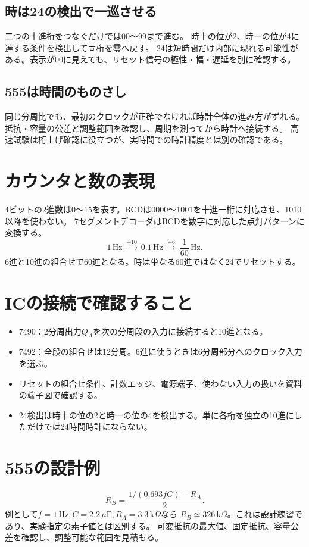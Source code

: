 \documentclass[lualatex,a4paper,10pt]{jlreq}
\begin{document}
\subsection{時は24の検出で一巡させる}
二つの十進桁をつなぐだけでは00〜99まで進む。
時十の位が2、時一の位が4に達する条件を検出して両桁を零へ戻す。
24は短時間だけ内部に現れる可能性がある。表示が00に見えても、リセット信号の極性・幅・遅延を別に確認する。
\subsection{555は時間のものさし}
同じ分周比でも、最初のクロックが正確でなければ時計全体の進み方がずれる。
抵抗・容量の公差と調整範囲を確認し、周期を測ってから時計へ接続する。
高速試験は桁上げ確認に役立つが、実時間での時計精度とは別の確認である。

\section{カウンタと数の表現}\label{sec:auto3}
4ビットの2進数は0〜15を表す。BCDは0000〜1001を十進一桁に対応させ、1010以降を使わない。
7セグメントデコーダはBCDを数字に対応した点灯パターンに変換する。
\[
 1\,\mathrm{Hz}\ \xrightarrow{\div10}\ 0.1\,\mathrm{Hz}
 \ \xrightarrow{\div6}\ \frac1{60}\,\mathrm{Hz}.
\]
6進と10進の組合せで60進となる。時は単なる60進ではなく24でリセットする。
\section{ICの接続で確認すること}\label{sec:auto4}
\begin{itemize}
\item 7490：2分周出力$Q_A$を次の分周段の入力に接続すると10進となる。
\item 7492：全段の組合せは12分周。6進に使うときは6分周部分へのクロック入力を選ぶ。
\item リセットの組合せ条件、計数エッジ、電源端子、使わない入力の扱いを資料の端子図で確認する。
\item 24検出は時十の位の2と時一の位の4を検出する。単に各桁を独立の10進にしただけでは24時間時計にならない。
\end{itemize}
\section{555の設計例}\label{sec:auto5}
\[
 R_B=\frac{1/(0.693fC)-R_A}{2}.
\]
例として$f=1\,\mathrm{Hz},C=2.2\,\mu\mathrm{F},R_A=3.3\,\mathrm{k}\Omega$なら
$R_B\simeq326\,\mathrm{k}\Omega$。これは設計練習であり、実験指定の素子値とは区別する。
可変抵抗の最大値、固定抵抗、容量公差を確認し、調整可能な範囲を見積もる。
\clearpage
\end{document}
